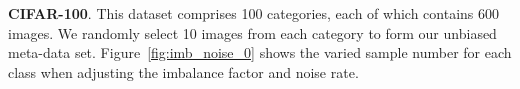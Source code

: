 \documentclass[letterpaper]{article} %
\newcommand{\bd}[1]{\textbf{#1}}
\begin{document}
\noindent\bd{CIFAR-100}. This dataset comprises 100 categories, each of which contains 600 images.
We randomly select 10 images from each category to form our unbiased meta-data set.
Figure~\ref{fig:imb_noise_0} shows the varied sample number for each class when adjusting the imbalance factor and noise rate. 

\begin{figure}[t]
\centering
{}%
\end{figure}
\end{document}
